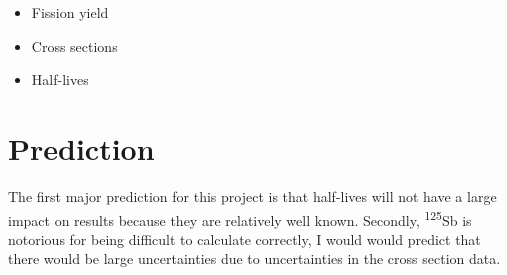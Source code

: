 \documentclass[11pt,notitlepage]{article}
\newcommand{\tss}{\textsuperscript}
\begin{document}
\begin{itemize}
\item{Fission yield}
\item{Cross sections}
\item{Half-lives}
\end{itemize}


\section{Prediction}

The first major prediction for this project is that half-lives
will not have a large impact on results because they are
relatively well known. Secondly, \tss{125}Sb is notorious
for being difficult to calculate correctly, I would would predict that
there would be large uncertainties due to uncertainties in
the cross section data.



\end{document}
